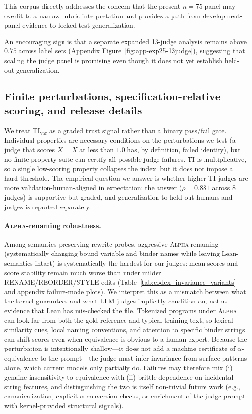 \documentclass{article}
\begin{document}
This corpus directly addresses the concern that the present \(n=75\) panel may overfit to a narrow rubric interpretation and provides a path from development-panel evidence to locked-test generalization.

An encouraging sign is that a separate expanded 13-judge analysis remains above \(0.75\) across label sets (Appendix Figure~\ref{fig:app-exp25-13judge}), suggesting that scaling the judge panel is promising even though it does not yet establish held-out generalization.

\subsection{Finite perturbations, specification-relative scoring, and release details}\label{sec:limitations-finite}
We treat \(\mathrm{TI}_{\mathrm{var}}\) as a graded trust signal rather than a binary pass/fail gate.
Individual properties are necessary conditions on the perturbations we test (a judge that scores \(X=X\) at less than \(1.0\) has, by definition, failed identity), but no finite property suite can certify all possible judge failures.
TI is multiplicative, so a single low-scoring property collapses the index, but it does not impose a hard threshold.
The empirical question we answer is whether higher-TI judges are more validation-human-aligned in expectation; the answer (\(\rho=0.881\) across \(8\) judges) is supportive but graded, and generalization to held-out humans and judges is reported separately.

\paragraph{\textsc{Alpha}-renaming robustness.}
Among semantics-preserving rewrite probes, aggressive \textsc{Alpha}-renaming (systematically changing bound variable and binder names while leaving Lean-semantics intact) is systematically the hardest for our judges: mean scores and score stability remain much worse than under milder RENAME/REORDER/STYLE edits (Table~\ref{tab:codex_invariance_variants} and appendix failure-mode plots).
We interpret this as a mismatch between what the kernel guarantees and what LLM judges implicitly condition on, not as evidence that Lean has mis-checked the file.
Tokenized programs under \textsc{Alpha} can look far from both the gold reference and typical training text, so lexical-similarity cues, local naming conventions, and attention to specific binder strings can shift scores even when equivalence is obvious to a human expert.
Because the perturbation is intentionally shallow---it does not add a machine certificate of \(\alpha\)-equivalence to the prompt---the judge must infer invariance from surface patterns alone, which current models only partially do.
Failures may therefore mix (i) genuine insensitivity to equivalence with (ii) brittle dependence on incidental string features, and distinguishing the two is itself non-trivial future work (e.g., canonicalization, explicit $\alpha$-conversion checks, or enrichment of the judge prompt with kernel-provided structural signals).
\end{document}
